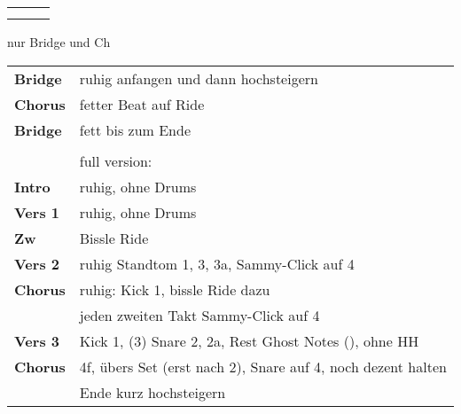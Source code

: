 

\begin{tabular}{p{0.6cm}p{12cm}p{1.4cm}}
	\rowcolor{cyan} \myRow{\thesongnumber} & \myRow{Gotteslamm} & \myRow{70} \\
	                                       &                    &            \\
\end{tabular}

nur Bridge und Ch

\begin{tabular}{p{1.6cm}l}
	\textbf{Bridge} & ruhig anfangen und dann hochsteigern                              \\
	\textbf{Chorus} & fetter Beat auf Ride                                              \\
	\textbf{Bridge} & fett bis zum Ende                                                 \\
	                &                                                                   \\
	                & full version:                                                     \\
	\textbf{Intro}  & ruhig, ohne Drums                                                 \\
	\textbf{Vers 1} & ruhig, ohne Drums                                                 \\
	\textbf{Zw}     & Bissle Ride                                                       \\
	\textbf{Vers 2} & ruhig Standtom 1, 3, 3a, Sammy-Click auf 4                        \\
	\textbf{Chorus} & ruhig: Kick 1, bissle Ride dazu                                   \\
	                & jeden zweiten Takt Sammy-Click auf 4                              \\
	\textbf{Vers 3} & Kick 1, (3) Snare 2, 2a, Rest Ghost Notes (\sechzehntel), ohne HH \\
	\textbf{Chorus} & 4f, übers Set (erst nach 2), Snare auf 4, noch dezent halten      \\
	                & Ende kurz \achtel hochsteigern                                    \\

\end{tabular}
